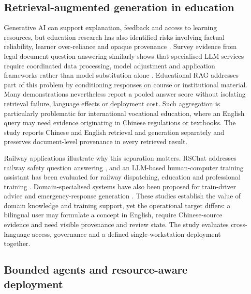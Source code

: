 \subsection{Retrieval-augmented generation in education}

Generative AI can support explanation, feedback and access to learning resources, but education research has also identified risks involving factual reliability, learner over-reliance and opaque provenance \citep{kasneci2023chatgpt,unesco2023guidance}. Survey evidence from legal-document question answering similarly shows that specialised LLM services require coordinated data processing, model adjustment and application frameworks rather than model substitution alone \citep{yang2024legalqa}. Educational RAG addresses part of this problem by conditioning responses on course or institutional material. Many demonstrations nevertheless report a pooled answer score without isolating retrieval failure, language effects or deployment cost. Such aggregation is particularly problematic for international vocational education, where an English query may need evidence originating in Chinese regulations or textbooks. The study reports Chinese and English retrieval and generation separately and preserves document-level provenance in every retrieved result.

Railway applications illustrate why this separation matters. RSChat addresses railway safety question answering \citep{li2024rschat}, and an LLM-based human-computer training assistant has been evaluated for railway dispatching, education and professional training \citep{li2025training}. Domain-specialised systems have also been proposed for train-driver advice and emergency-response generation \citep{luo2025driver,huang2026emergency}. These studies establish the value of domain knowledge and training support, yet the operational target differs: a bilingual user may formulate a concept in English, require Chinese-source evidence and need visible provenance and review state. The study evaluates cross-language access, governance and a defined single-workstation deployment together.

\subsection{Bounded agents and resource-aware deployment}

